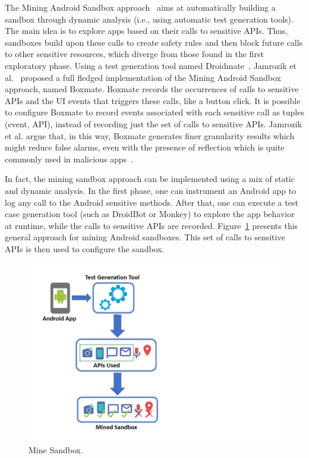 The Mining Android Sandbox approach~\cite{DBLP:conf/icse/JamrozikSZ16} aims at automatically
building a sandbox through dynamic analysis (i.e., using automatic test generation tools).
The main idea is to explore apps based on their calls to sensitive APIs.
Thus, sandboxes build upon these calls to create safety rules and then block future
calls to other sensitive resources, which diverge from those found in the first exploratory
phase. Using a test generation tool named Droidmate~\cite{DBLP:conf/icse/JamrozikZ16},
Jamrozik et al.~\cite{DBLP:conf/icse/JamrozikSZ16} proposed a full fledged
implementation of the Mining Android Sandbox approach, named Boxmate. 
Boxmate records the occurrences of calls to sensitive APIs and the UI events that triggers these calls,
like a button click. It is possible to configure Boxmate to record events associated with each sensitive call as
tuples (event, API), instead of recording just the set of calls to sensitive APIs. Jamrozik et al. argue that, in this way, Boxmate generates finer granularity results which
might reduce false alarms, even with the presence of reflection which is quite commonly used in
malicious apps~\cite{DBLP:conf/issta/0029BOK16}.

In fact, the mining sandbox approach can be implemented using
a mix of static and dynamic analysis. In the first phase, one
can instrument an Android app to log any call to the Android sensitive methods.
After that, one can execute a test case generation tool (such as DroidBot
or Monkey) to explore the app behavior at runtime,
while the calls to sensitive APIs are recorded.
Figure~\ref{fig:mineSandbox} presents this general approach for mining
Android sandboxes. This set of calls to sensitive APIs is then used
to configure the sandbox. 


\begin{figure}[ht]
\centering
\includegraphics[scale=0.35]{images/mineSandbox_.pdf}
\caption{Mine Sandbox.}
 \label{fig:mineSandbox}
\end{figure}

